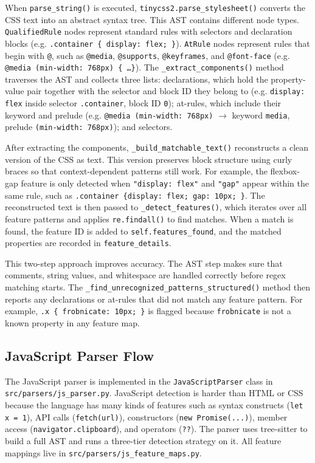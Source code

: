 When \texttt{parse\_string()} is executed, \texttt{tinycss2.parse\_stylesheet()} converts the CSS text into an abstract syntax tree. This AST contains different node types. \texttt{QualifiedRule} nodes represent standard rules with selectors and declaration blocks (e.g. \texttt{.container \{ display: flex; \}}). \texttt{AtRule} nodes represent rules that begin with \texttt{@}, such as \texttt{@media}, \texttt{@supports}, \texttt{@keyframes}, and \texttt{@font-face} (e.g. \texttt{@media (min-width: 768px) \{ \ldots \}}). The \texttt{\_extract\_components()} method traverses the AST and collects three lists: declarations, which hold the property-value pair together with the selector and block ID they belong to (e.g. \texttt{display: flex} inside selector \texttt{.container}, block ID \texttt{0}); at-rules, which include their keyword and prelude (e.g. \texttt{@media (min-width: 768px)} $\to$ keyword \texttt{media}, prelude \texttt{(min-width: 768px)}); and selectors.

After extracting the components, \texttt{\_build\_matchable\_text()} reconstructs a clean version of the CSS as text. This version preserves block structure using curly braces so that context-dependent patterns still work. For example, the flexbox-gap feature is only detected when \texttt{"display: flex"} and \texttt{"gap"} appear within the same rule, such as \texttt{.container \{display: flex; gap: 10px; \}}. The reconstructed text is then passed to \texttt{\_detect\_features()}, which iterates over all feature patterns and applies \texttt{re.findall()} to find matches. When a match is found, the feature ID is added to \texttt{self.features\_found}, and the matched properties are recorded in \texttt{feature\_details}.

This two-step approach improves accuracy. The AST step makes sure that comments, string values, and whitespace are handled correctly before regex matching starts. The \texttt{\_find\_unrecognized\_patterns\_structured()} method then reports any declarations or at-rules that did not match any feature pattern. For example, \texttt{.x \{ frobnicate: 10px; \}} is flagged because \texttt{frobnicate} is not a known property in any feature map. 

\subsection{JavaScript Parser Flow}

The JavaScript parser is implemented in the \texttt{JavaScriptParser} class in \texttt{src/parsers/js\_parser.py}. JavaScript detection is harder than HTML or CSS because the language has many kinds of features such as syntax constructs (\texttt{let x = 1}), API calls (\texttt{fetch(url)}), constructors (\texttt{new Promise(...)}), member access (\texttt{navigator.clipboard}), and operators (\texttt{??}). The parser uses tree-sitter to build a full AST and runs a three-tier detection strategy on it. All feature mappings live in \texttt{src/parsers/js\_feature\_maps.py}.

